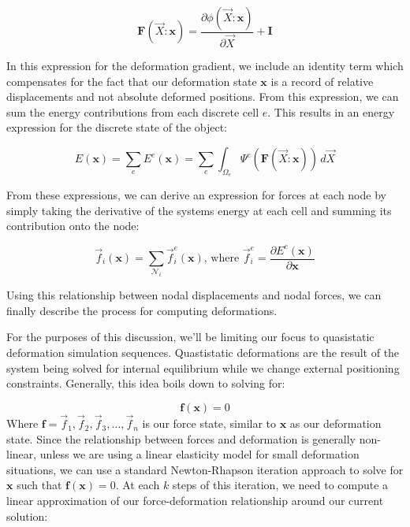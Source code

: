 \documentclass[12pt,oneside,letterpaper]{memoir}
\begin{document}
\begin{equation}
  \label{equ:discretedeformationgradient}
  \mathbf F(\vec{X}:\mathbf x) = \frac{ \partial \phi(\vec{X}:\mathbf x)
  }{\partial \vec{X}} + \mathbf I
\end{equation}

In this expression for the deformation gradient, we include an
identity term which compensates for the fact that our deformation
state $\mathbf x$ is a record of relative displacements and not
absolute deformed positions.  From this expression, we can sum the
energy contributions from each discrete cell $e$. This results in an
energy expression for the discrete state of the object:

\begin{equation}
  \label{equ:discreteenergy}
  E(\mathbf x) = \sum_e E^e(\mathbf x) = \sum_e \int_{\Omega_{e}}\Psi^e( \mathbf F(\vec{X}:\mathbf x) ) \,d \vec{X}
\end{equation}

From these expressions, we can derive an expression for forces at each
node by simply taking the derivative of the systems energy at each
cell and summing its contribution onto the node:

\begin{equation}
  \label{equ:discreteforces}
  \vec{f}_i(\mathbf x) = \sum_{\mathcal N_i} \vec{f}_i^e(\mathbf x)
  \text{, where } \vec{f}_i^e = \frac{\partial E^e(\mathbf x)}{\partial \mathbf x}
\end{equation}

Using this relationship between nodal displacements and nodal forces,
we can finally describe the process for computing deformations.

For the purposes of this discussion, we'll be limiting our focus to
quasistatic deformation simulation sequences. Quastistatic deformations are the
result of the system being solved for internal equilibrium while we
change external positioning constraints. Generally, this idea boils
down to solving for:

$$
\mathbf f(\mathbf x) = 0
$$
Where
$\mathbf f = {\vec{f}_1, \vec{f}_2, \vec{f}_3, \ldots, \vec{f}_n}$ is
our force state, similar to $\mathbf x$ as our deformation state.
Since the relationship between forces and deformation is generally
non-linear, unless we are using a linear elasticity model for small
deformation situations, we can use a standard Newton-Rhapson iteration
approach to solve for $\mathbf x$ such that $\mathbf f(\mathbf x) =
0$. At each $k$ steps of this iteration, we need to compute a linear
approximation of our force-deformation relationship around our current
solution:
\end{document}
